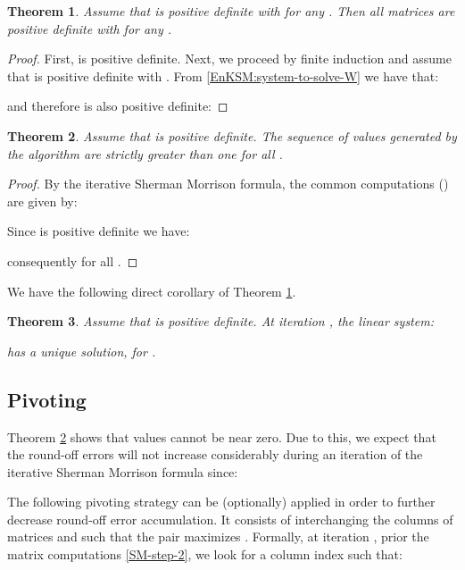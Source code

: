 \documentclass[12pt]{article}
\newtheorem{theorem}{Theorem}
\begin{document}
 
\begin{theorem}
\label{Theo:sequence-positive}
Assume that  is positive definite with  for any .
Then all matrices  are positive definite with  for any .
\end{theorem} 
 
\begin{proof}
First,  is positive definite. Next, we proceed by finite induction and assume that  is positive definite
with .
From \eqref{EnKSM:system-to-solve-W} we have that:

and therefore  is also positive definite:

\end{proof} 
 
\begin{theorem}
\label{Theo:non-zero-gamma-values}
Assume that  is positive definite. The sequence of values  generated by the algorithm are strictly greater than one for all .
\end{theorem}


\begin{proof}
By the iterative Sherman Morrison formula, the common computations () are given by:

Since  is positive definite we have:

consequently  for all .
\end{proof}


We have the following direct corollary of Theorem \ref{Theo:sequence-positive}.

\begin{theorem}
\label{Theo:sequence-non-singular}
Assume that  is positive definite. At iteration , the linear system:

has a unique solution, for .
\end{theorem}




\subsection{Pivoting}
\label{pivoting}


Theorem \ref{Theo:non-zero-gamma-values} shows that  values cannot be near zero. Due to this, we expect that the round-off errors will not increase considerably during an iteration of the iterative Sherman Morrison formula since:


The following pivoting strategy can be (optionally) applied in order to further decrease round-off error accumulation. It consists of interchanging the columns of matrices  and  such that the pair  maximizes . Formally, at iteration , prior the matrix computations \eqref{SM-step-2}, we look for a column index  such that:
\end{document}
